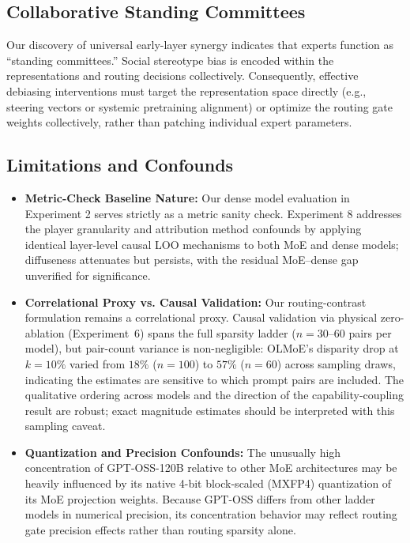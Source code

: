 \documentclass[11pt,a4paper]{article}
\begin{document}
\subsection{Collaborative Standing Committees}
Our discovery of universal early-layer synergy indicates that experts function as ``standing committees.'' Social stereotype bias is encoded within the representations and routing decisions collectively. Consequently, effective debiasing interventions must target the representation space directly (e.g., steering vectors or systemic pretraining alignment) or optimize the routing gate weights collectively, rather than patching individual expert parameters.

\subsection{Limitations and Confounds}
\begin{itemize}
    \item \textbf{Metric-Check Baseline Nature:} Our dense model evaluation in Experiment 2 serves strictly as a metric sanity check. Experiment 8 addresses the player granularity and attribution method confounds by applying identical layer-level causal LOO mechanisms to both MoE and dense models; diffuseness attenuates but persists, with the residual MoE--dense gap unverified for significance.
    \item \textbf{Correlational Proxy vs. Causal Validation:} Our routing-contrast formulation remains a correlational proxy. Causal validation via physical zero-ablation (Experiment~6) spans the full sparsity ladder ($n = 30$--$60$ pairs per model), but pair-count variance is non-negligible: OLMoE's disparity drop at $k=10\%$ varied from $18\%$ ($n=100$) to $57\%$ ($n=60$) across sampling draws, indicating the estimates are sensitive to which prompt pairs are included. The qualitative ordering across models and the direction of the capability-coupling result are robust; exact magnitude estimates should be interpreted with this sampling caveat.
    \item \textbf{Quantization and Precision Confounds:} The unusually high concentration of GPT-OSS-120B relative to other MoE architectures may be heavily influenced by its native 4-bit block-scaled (MXFP4) quantization of its MoE projection weights. Because GPT-OSS differs from other ladder models in numerical precision, its concentration behavior may reflect routing gate precision effects rather than routing sparsity alone.
\end{itemize}
\end{document}
